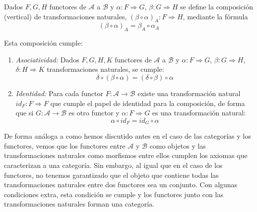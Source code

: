 \begin{figure}[htpb]
    \centering
\end{figure}

\begin{definicion}
        Dados $F,G,H$ functores de $\mathscr{A}$ a $\mathscr{B}$ y $\alpha: F \Rightarrow G$, $\beta: G \Rightarrow H$ se define la composición (vertical) de transformaciones naturales, $(\beta \circ \alpha)_{A}: F \Rightarrow H$, mediante la fórmula \begin{equation}
        (\beta \circ \alpha)_{A} = \beta_{A} \circ \alpha_{A}
    \end{equation}
    
    Esta composición cumple:
    
    \begin{enumerate}
        \item \textit{Asociatividad: } Dados $F,G,H, K$ functores de $\mathscr{A}$ a $\mathscr{B}$ y $\alpha: F \Rightarrow G$, $\beta: G \Rightarrow H$, $\delta: H \Rightarrow K$ transformaciones naturales, se cumple: \begin{equation}
            \delta \circ (\beta \circ \alpha) = (\delta \circ \beta) \circ \alpha
        \end{equation} 
        \item \textit{Identidad: }  Para cada functor $F: \mathscr{A} \longrightarrow \mathscr{B}$ existe una transformación natural $id_{F}: F \Rightarrow F$ que cumple el papel de identidad para la composición, de forma que si $G: \mathscr{A} \longrightarrow \mathscr{B}$ es otro functor y $\alpha: F \Rightarrow G$ es una transformación natural: \begin{equation}
            \alpha \circ id_{F} = id_{G} \circ \alpha
        \end{equation}
    \end{enumerate}
\end{definicion}

De forma análoga a como hemos discutido antes en el caso de las categorías y los functores, vemos que los functores entre $\mathscr{A}$ y $\mathscr{B}$ como objetos y las transformaciones naturales como morfismos entre ellos cumplen los axiomas que caracterizan a una categoría. Sin embargo, al igual que en el caso de los functores, no tenemos garantizado que el objeto que contiene todas las transformaciones naturales entre dos functores sea un conjunto. Con algunas condiciones extra, esta condición se cumple y los functores junto con las transformaciones naturales forman una categoría.


